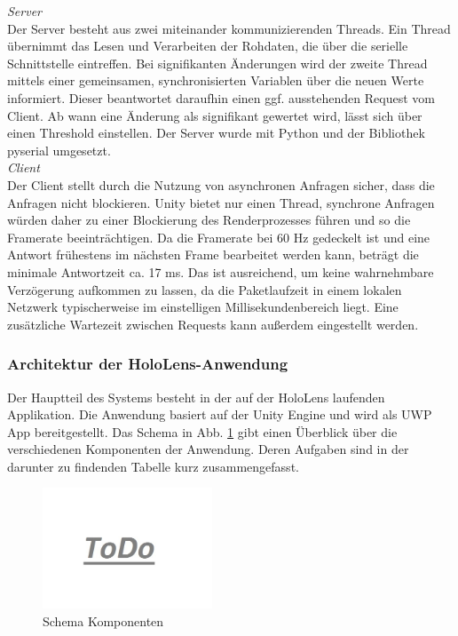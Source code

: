\textit{Server}\\
Der Server besteht aus zwei miteinander kommunizierenden Threads. Ein Thread übernimmt das Lesen und Verarbeiten der Rohdaten, die über die serielle Schnittstelle eintreffen. Bei signifikanten Änderungen wird der zweite Thread mittels einer gemeinsamen, synchronisierten Variablen über die neuen Werte informiert. Dieser beantwortet daraufhin einen ggf. ausstehenden Request vom Client. Ab wann eine Änderung als signifikant gewertet wird, lässt sich über einen Threshold einstellen. Der Server wurde mit Python und der Bibliothek pyserial umgesetzt.\\

\textit{Client}\\
Der Client stellt durch die Nutzung von asynchronen Anfragen sicher, dass die Anfragen nicht blockieren. Unity bietet nur einen Thread, synchrone Anfragen würden daher zu einer Blockierung des Renderprozesses führen und so die Framerate beeinträchtigen. Da die Framerate bei 60 Hz gedeckelt ist und eine Antwort frühestens im nächsten Frame bearbeitet werden kann, beträgt die minimale Antwortzeit ca. 17 ms. Das ist ausreichend, um keine wahrnehmbare Verzögerung aufkommen zu lassen, da die Paketlaufzeit in einem lokalen Netzwerk typischerweise im einstelligen Millisekundenbereich liegt. Eine zusätzliche Wartezeit zwischen Requests kann außerdem eingestellt werden.\\

\subsubsection{Architektur der HoloLens-Anwendung}
\label{sec-5-1-2}
Der Hauptteil des Systems besteht in der auf der HoloLens laufenden Applikation. Die Anwendung basiert auf der Unity Engine und wird als UWP App bereitgestellt. Das Schema in Abb. \ref{img:components-schema} gibt einen Überblick über die verschiedenen Komponenten der Anwendung. Deren Aufgaben sind in der darunter zu findenden Tabelle kurz zusammengefasst.

\begin{figure}[H]
	\centering
	\includegraphics[width=0.45\textwidth]{images/todo.jpg}
	\caption{Schema Komponenten}
	\label{img:components-schema}
\end{figure}


